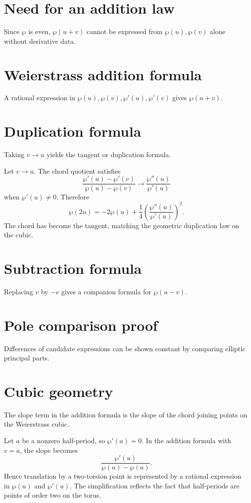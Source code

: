 \section{Need for an addition law}
Since $\wp$ is even, $\wp(u+v)$ cannot be expressed from $\wp(u),\wp(v)$ alone without derivative data.

\section{Weierstrass addition formula}
A rational expression in $\wp(u),\wp(v),\wp'(u),\wp'(v)$ gives $\wp(u+v)$.

\section{Duplication formula}
Taking $v\to u$ yields the tangent or duplication formula.

\begin{example}\label{ex:iv30-expand-02}
Let \(v\to u\). The chord quotient satisfies
\[
\frac{\wp'(u)-\wp'(v)}{\wp(u)-\wp(v)}\longrightarrow
\frac{\wp''(u)}{\wp'(u)}
\]
when \(\wp'(u)\ne0\). Therefore
\[
\wp(2u)=-2\wp(u)+\frac14\left(\frac{\wp''(u)}{\wp'(u)}\right)^2.
\]
The chord has become the tangent, matching the geometric duplication law on the cubic.
\end{example}
\section{Subtraction formula}
Replacing $v$ by $-v$ gives a companion formula for $\wp(u-v)$.

\section{Pole comparison proof}
Differences of candidate expressions can be shown constant by comparing elliptic principal parts.

\section{Cubic geometry}
The slope term in the addition formula is the slope of the chord joining points on the Weierstrass cubic.

\begin{example}\label{ex:iv30-expand-03}
Let \(a\) be a nonzero half-period, so \(\wp'(a)=0\). In the addition formula with \(v=a\), the slope becomes
\[
\frac{\wp'(u)}{\wp(u)-\wp(a)}.
\]
Hence translation by a two-torsion point is represented by a rational expression in \(\wp(u)\) and \(\wp'(u)\). The simplification reflects the fact that half-periods are points of order two on the torus.
\end{example}
